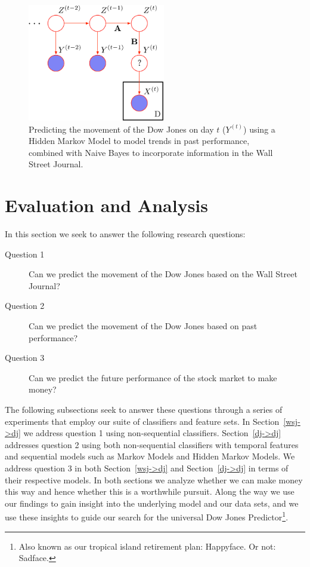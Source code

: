 \documentclass[10pt, twocolumn]{article}
\begin{document}
\begin{figure}
\center
\includegraphics[width=6cm]{figs/hmm-nb-predict.pdf}
\caption{Predicting the movement of the Dow Jones on day $t$ ($Y^{(t)}$) using a Hidden Markov Model to model trends in past performance, combined with Naive Bayes to incorporate information in the Wall Street Journal.}
\label{fig:hmm-nb-predict}
\end{figure}

\section{Evaluation and Analysis}

In this section we seek to answer the following research questions:
\begin{description}
\item[Question 1] Can we predict the movement of the Dow Jones based on the Wall Street Journal?
\item[Question 2] Can we predict the movement of the Dow Jones based on past performance?
\item[Question 3] Can we predict the future performance of the stock market to make money?
\end{description}

The following subsections seek to answer these questions through a series of experiments that employ our suite of classifiers and feature sets.
In Section~\ref{wsj->dj} we address question 1 using non-sequential classifiers.
Section~\ref{dj->dj} addresses question 2 using both non-sequential classifiers with temporal features and sequential models such as Markov Models and Hidden Markov Models.
We address question 3 in both Section~\ref{wsj->dj} and Section~\ref{dj->dj} in terms of their respective models.
In both sections we analyze whether we can make money this way and hence whether this is a worthwhile pursuit.
Along the way we use our findings to gain insight into the underlying model and our data sets, and we use these insights to guide our search for the universal Dow Jones Predictor\footnote{Also known as our tropical island retirement plan: Happyface. Or not: Sadface.}.
\end{document}

